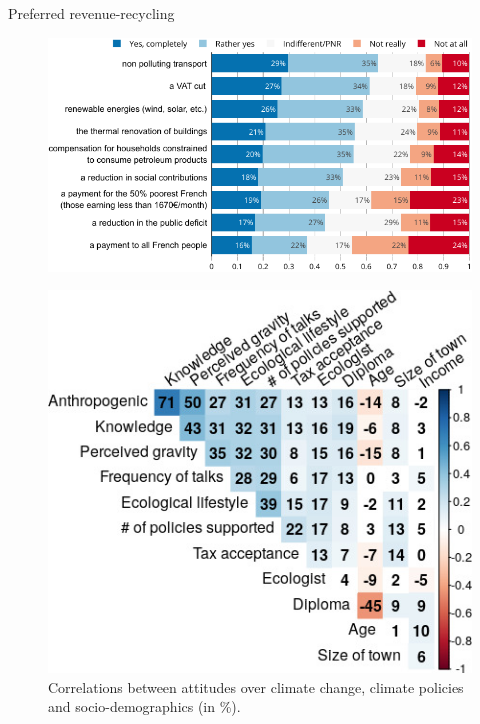 \documentclass[aspectratio=169,9pt,dvipsnames]{beamer}
\begin{document}
    \begin{frame}{Preferred revenue-recycling}\label{preferred_revenue_recycling}

\begin{figure}
\includegraphics[scale=0.5]{Images/tax_condition_val.png}
\end{figure}

\hyperlink{discussion}{}

    \end{frame}
    \begin{frame}{}

\begin{figure}[!htbp]
\centering
\includegraphics[width=0.6\columnwidth]{Images/correlation_matrix2.jpeg}
\caption{Correlations between attitudes over climate change, climate policies and socio-demographics (in \%).}
\end{figure}

    \end{frame}
    
\end{document}
